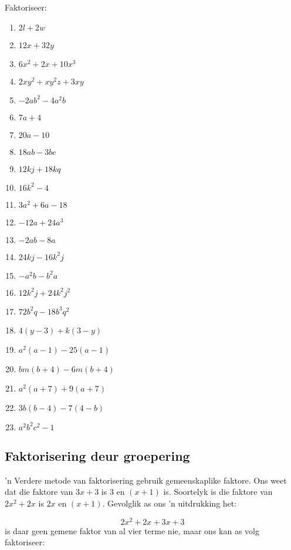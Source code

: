 \begin{exercises}{}
{
Faktoriseer:
\begin{multicols}{2}
\begin{enumerate}[itemsep=5pt, label=\textbf{\arabic*}. ] 
\item $2l+2w$
\item $12x+32y$
\item $6{x}^{2}+2x+10{x}^{3}$
\item $2x{y}^{2}+x{y}^{2}z+3xy$
\item $-2a{b}^{2}-4{a}^{2}b$
\item $7a+4$ 
\item $20a-10$ 
\item $18ab-3bc$
\item $12kj+18kq$ 
\item $16{k}^{2}-4$ 
\item $3{a}^{2}+6a-18$
\item $-12a+24a^3$ 
\item $-2ab-8a$ 
\item $24kj-16{k}^{2}j$
\item $-{a}^{2}b-{b}^{2}a$ 
\item $12{k}^{2}j+24{k}^{2}{j}^{2}$ 
\item $72{b}^{2}q-18{b}^{3}{q}^{2}$
\item $4(y-3)+k(3-y)$ 
\item $a^2(a-1)-25(a-1)$ 
\item $bm(b+4)-6m(b+4)$
\item ${a}^{2}(a+7)+9(a+7)$ 
\item $3b(b-4)-7(4-b)$ 
\item ${a}^{2}{b}^{2}{c}^{2}-1$
\end{enumerate}
\end{multicols}

}
\end{exercises}

\subsection{Faktorisering deur groepering}
\nopagebreak

’n Verdere metode van faktorisering gebruik gemeenskaplike faktore. Ons weet dat die faktore van $3x+3$ is $3$ en $(x+1)$ is. Soortelyk is die faktore van $2{x}^{2}+2x$ is $2x$ en $(x+1)$. Gevolglik as ons ’n uitdrukking het:

\begin{equation*}
2{x}^{2}+2x+3x+3
\end{equation*}
is daar geen gemene faktor van al vier terme nie, maar ons kan as volg faktoriseer:
\nopagebreak\noindent{}

